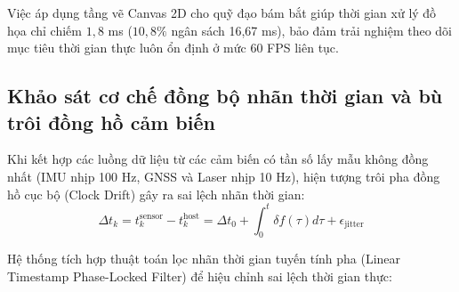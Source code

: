 \begin{table}[H]
\centering
\caption{Đo đạc hiệu năng render của các phương pháp trực quan hóa bản đồ số}
\label{tab:client-rendering-performance}
\end{table}

Việc áp dụng tầng vẽ Canvas 2D cho quỹ đạo bám bắt giúp thời gian xử lý đồ họa chỉ chiếm $1{,}8$ ms ($10{,}8\%$ ngân sách 16,67 ms), bảo đảm trải nghiệm theo dõi mục tiêu thời gian thực luôn ổn định ở mức 60 FPS liên tục.

\subsection{Khảo sát cơ chế đồng bộ nhãn thời gian và bù trôi đồng hồ cảm biến}

\hspace{0.5cm} Khi kết hợp các luồng dữ liệu từ các cảm biến có tần số lấy mẫu không đồng nhất (IMU nhịp 100 Hz, GNSS và Laser nhịp 10 Hz), hiện tượng trôi pha đồng hồ cục bộ (Clock Drift) gây ra sai lệch nhãn thời gian:
\begin{equation}
\Delta t_k = t_k^{\text{sensor}} - t_k^{\text{host}} = \Delta t_0 + \int_0^t \delta f(\tau) d\tau + \epsilon_{\text{jitter}}
\label{eq:clock-drift-integral}
\end{equation}

Hệ thống tích hợp thuật toán lọc nhãn thời gian tuyến tính pha (Linear Timestamp Phase-Locked Filter) để hiệu chỉnh sai lệch thời gian thực:

